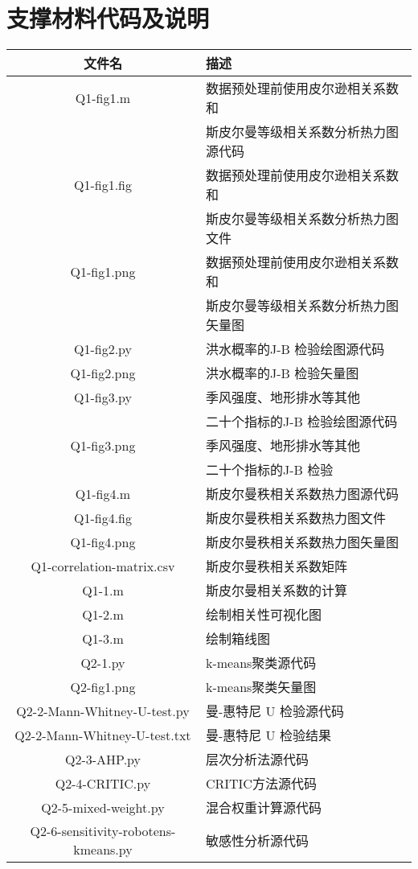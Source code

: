 \documentclass[withoutpreface,bwprint]{cumcmthesis} %
\begin{document}
\newpage
\appendix
\section{支撑材料代码及说明}
\begin{longtable}[htbp]{cl}
		\hline
		文件名 & 描述 \\
		\hline
		Q1-fig1.m & 数据预处理前使用皮尔逊相关系数和\\ &斯皮尔曼等级相关系数分析热力图源代码 \\
		Q1-fig1.fig & 数据预处理前使用皮尔逊相关系数和 \\ & 斯皮尔曼等级相关系数分析热力图文件 \\
		Q1-fig1.png & 数据预处理前使用皮尔逊相关系数和 \\ & 斯皮尔曼等级相关系数分析热力图矢量图 \\
		Q1-fig2.py & 洪水概率的J-B 检验绘图源代码 \\
		Q1-fig2.png & 洪水概率的J-B 检验矢量图 \\
		Q1-fig3.py & 季风强度、地形排水等其他\\ & 二十个指标的J-B 检验绘图源代码 \\
		Q1-fig3.png & 季风强度、地形排水等其他 \\& 二十个指标的J-B 检验 \\
		Q1-fig4.m & 斯皮尔曼秩相关系数热力图源代码 \\
		Q1-fig4.fig & 斯皮尔曼秩相关系数热力图文件 \\
		Q1-fig4.png & 斯皮尔曼秩相关系数热力图矢量图 \\
		Q1-correlation-matrix.csv & 斯皮尔曼秩相关系数矩阵 \\
		Q1-1.m & 斯皮尔曼相关系数的计算 \\
		Q1-2.m & 绘制相关性可视化图 \\
		Q1-3.m & 绘制箱线图 \\
		Q2-1.py & k-means聚类源代码 \\
		Q2-fig1.png & k-means聚类矢量图 \\
		Q2-2-Mann-Whitney-U-test.py & 曼-惠特尼 U 检验源代码 \\
		Q2-2-Mann-Whitney-U-test.txt & 曼-惠特尼 U 检验结果 \\
		Q2-3-AHP.py & 层次分析法源代码 \\
		Q2-4-CRITIC.py & CRITIC方法源代码 \\
		Q2-5-mixed-weight.py & 混合权重计算源代码 \\
		Q2-6-sensitivity-robotens-kmeans.py & 敏感性分析源代码 \\

\end{longtable}
\end{document}
